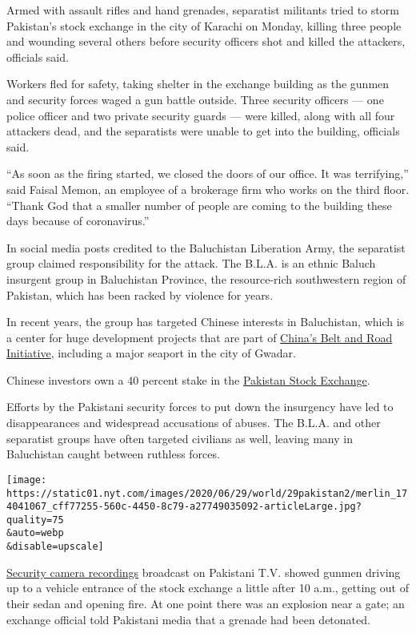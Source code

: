 Armed with assault rifles and hand grenades, separatist militants tried
to storm Pakistan's stock exchange in the city of Karachi on Monday,
killing three people and wounding several others before security
officers shot and killed the attackers, officials said.

Workers fled for safety, taking shelter in the exchange building as the
gunmen and security forces waged a gun battle outside. Three security
officers --- one police officer and two private security guards --- were
killed, along with all four attackers dead, and the separatists were
unable to get into the building, officials said.

``As soon as the firing started, we closed the doors of our office. It
was terrifying,'' said Faisal Memon, an employee of a brokerage firm who
works on the third floor. ``Thank God that a smaller number of people
are coming to the building these days because of coronavirus.''

In social media posts credited to the Baluchistan Liberation Army, the
separatist group claimed responsibility for the attack. The B.L.A. is an
ethnic Baluch insurgent group in Baluchistan Province, the resource-rich
southwestern region of Pakistan, which has been racked by violence for
years.

In recent years, the group has targeted Chinese interests in
Baluchistan, which is a center for huge development projects that are
part of
\href{https://www.nytimes.com/2018/12/19/world/asia/pakistan-china-belt-road-military.html}{China's
Belt and Road Initiative}, including a major seaport in the city of
Gwadar.

Chinese investors own a 40 percent stake in the
\href{https://www.psx.com.pk/psx/exchange/profile/about-us}{Pakistan
Stock Exchange}.

Efforts by the Pakistani security forces to put down the insurgency have
led to disappearances and widespread accusations of abuses. The B.L.A.
and other separatist groups have often targeted civilians as well,
leaving many in Baluchistan caught between ruthless forces.

\texttt{[image: https://static01.nyt.com/images/2020/06/29/world/29pakistan2/merlin\_174041067\_cff77255-560c-4450-8c79-a27749035092-articleLarge.jpg?quality=75\\\&auto=webp\\\&disable=upscale]}

\href{https://www.youtube.com/watch?v=Em5hAz9XIUc}{Security camera
recordings} broadcast on Pakistani T.V. showed gunmen driving up to a
vehicle entrance of the stock exchange a little after 10 a.m., getting
out of their sedan and opening fire. At one point there was an explosion
near a gate; an exchange official told Pakistani media that a grenade
had been detonated.


